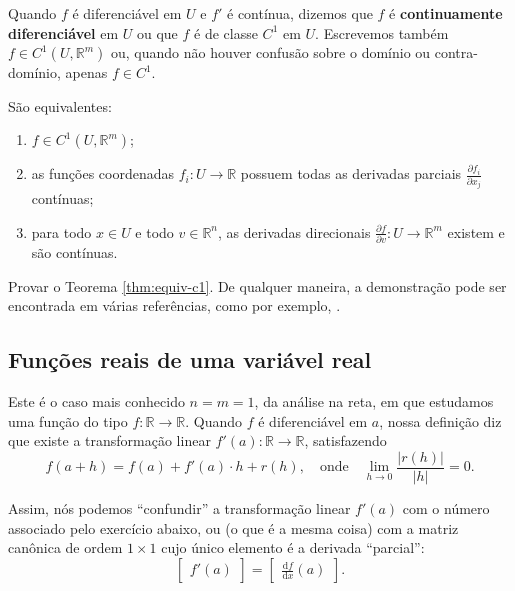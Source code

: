 Quando $f$ é diferenciável em $U$ e $f'$ é contínua, dizemos que $f$ é \textbf{continuamente diferenciável} em $U$ ou que $f$ é de classe $C^1$ em $U$. Escrevemos também $f \in C^1(U,\mathbb{R}^m)$ ou, quando não houver confusão sobre o domínio ou contra-domínio, apenas $f \in C^1$.

\begin{teo}\label{thm:equiv-c1}
	São equivalentes:
	\begin{enumerate}[$(i)$]
		\item $f \in C^1(U,\mathbb{R}^m)$;
		\item as funções coordenadas $f_i : U \to \mathbb{R}$ possuem todas as derivadas parciais $\frac{\partial f_i}{\partial x_j}$ contínuas;
		\item para todo $x \in U$ e todo $v \in \mathbb{R}^n$, as derivadas direcionais $\frac{\partial f}{\partial v}: U \to \mathbb{R}^m$ existem e são contínuas.
	\end{enumerate}
\end{teo}

\begin{exer}
	Provar o Teorema \ref{thm:equiv-c1}. De qualquer maneira, a demonstração pode ser encontrada em várias referências, como por exemplo, \cite{Lima-13,Lima-15,Rudi-64,Spiv-65}.
\end{exer}

\subsection{Funções reais de uma variável real}

Este é o caso mais conhecido $n = m = 1$, da análise na reta, em que estudamos uma função do tipo $f: \mathbb{R} \to \mathbb{R}$. Quando $f$ é diferenciável em $a$, nossa definição diz que existe a transformação linear $f'(a) : \mathbb{R} \to \mathbb{R}$, satisfazendo
\[
f(a + h) = f(a) + f'(a) \cdot h + r(h), \quad \text{onde} \quad \lim_{h \to 0} \frac{\big|r(h)\big|}{|h|} = 0.
\]

Assim, nós podemos ``confundir'' a transformação linear $f'(a)$ com o número associado pelo exercício abaixo, ou (o que é a mesma coisa) com a matriz canônica de ordem $1\times 1$ cujo único elemento é a derivada ``parcial'':
\[
\begin{bmatrix}
f'(a)
\end{bmatrix} = 
\begin{bmatrix}
\frac{\mathrm{d}  f}{\mathrm{d}  x} (a)
\end{bmatrix}.
\]

